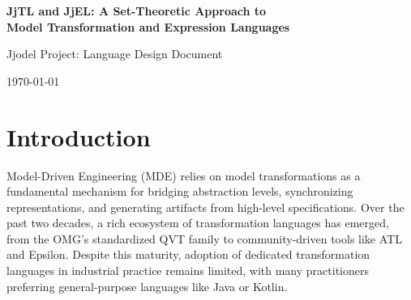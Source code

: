 \documentclass[11pt,a4paper]{article}
\newcommand{\jjmodal}{\textsf{JjModal}}
\newcommand{\jjlet}{\textsf{JjLet}}
\newcommand{\jjscript}{\textsf{JjScript}}
\newcommand{\jjel}{\textsf{JjEL}}
\newcommand{\jjtl}{\textsf{JjTL}}
\begin{document}

\begin{center}
{\LARGE\bfseries JjTL and JjEL: A Set-Theoretic Approach to\\[4pt] Model Transformation and Expression Languages}

\vspace{14pt}

{\large Jjodel Project: Language Design Document}

\vspace{10pt}

{\today}
\end{center}

\vspace{6pt}

\begin{abstract}
This document presents the design and rationale of the domain-specific languages developed within the Jjodel ecosystem: \jjel{} (Jjodel Expression Language), a set-theoretic expression language inspired by first-order logic; \jjtl{} (Jjodel Transformation Language), a declarative Model-to-Model transformation language; \jjmodal{}, a minimal interaction sub-language; \jjlet{}, a let-binding construct for interactive transformations; and \jjscript{} (Jjodel Scripting Language), an imperative command language for direct metamodel manipulation. We describe the syntax, semantics, and, most importantly, the \emph{design motivations} behind each language construct, explaining \emph{why} certain decisions were made and what alternatives were considered. We then provide a detailed comparison with four established transformation languages: ATL, EOL/ETL, QVT Relations, and QVT Operational Mappings. Finally, we present a series of parallel transformation examples across ATL, ETL, and \jjtl{} to enable direct syntactic and conceptual comparison.
\end{abstract}

\tableofcontents
\newpage

\section{Introduction}\label{sec:intro}

Model-Driven Engineering (MDE) relies on model transformations as a fundamental mechanism for bridging abstraction levels, synchronizing representations, and generating artifacts from high-level specifications. Over the past two decades, a rich ecosystem of transformation languages has emerged, from the OMG's standardized QVT family to community-driven tools like ATL and Epsilon. Despite this maturity, adoption of dedicated transformation languages in industrial practice remains limited, with many practitioners preferring general-purpose languages like Java or Kotlin.
\end{document}
